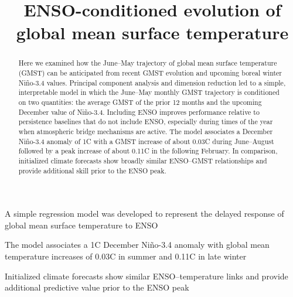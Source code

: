 \documentclass[draft]{agujournal2019}
\begin{document}
\title{ENSO-conditioned evolution of global mean surface temperature}




\begin{keypoints}
\item A simple regression model was developed to represent the delayed response of global mean surface temperature to ENSO
\item The model associates a 1\textdegree C December Ni\~no-3.4 anomaly with global mean temperature increases of 0.03\textdegree C in summer and 0.11\textdegree C in late winter
\item Initialized climate forecasts show similar ENSO--temperature links and provide additional predictive value prior to the ENSO peak
\end{keypoints}

\begin{abstract}
Here we examined how the June--May trajectory of global mean surface temperature (GMST) can be anticipated from recent GMST evolution and upcoming boreal winter Ni\~no-3.4 values. Principal component analysis and dimension reduction led to a simple, interpretable model in which the June--May monthly GMST trajectory is conditioned on two quantities: the average GMST of the prior 12 months and the upcoming December value of Ni\~no-3.4. Including ENSO improves performance relative to persistence baselines that do not include ENSO, especially during times of the year when atmospheric bridge mechanisms are active. The model associates a December Ni\~no-3.4 anomaly of 1\textdegree C with a GMST increase of about 0.03\textdegree C during June--August followed by a peak increase of about 0.11\textdegree C in the following February. In comparison, initialized climate forecasts show broadly similar ENSO--GMST relationships and provide additional skill prior to the ENSO peak.
\end{abstract}

\end{document}
